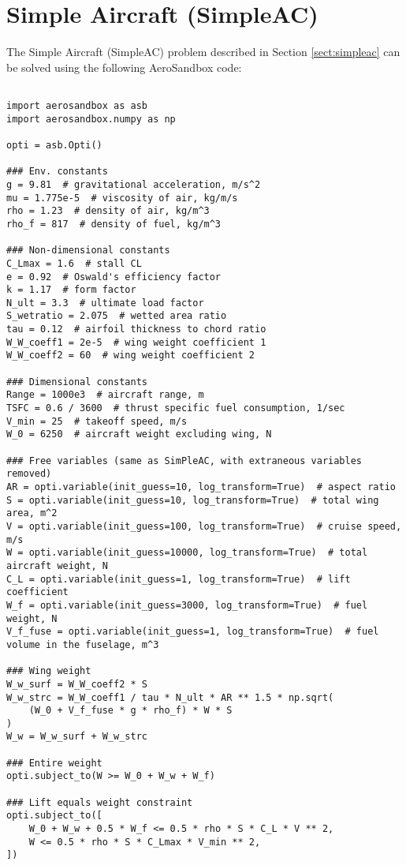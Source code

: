\section{Simple Aircraft (SimpleAC)}
\label{sect:simpleac-code}

The Simple Aircraft (SimpleAC) problem described in Section \ref{sect:simpleac} can be solved using the following AeroSandbox code:

\begin{verbatim}

import aerosandbox as asb
import aerosandbox.numpy as np

opti = asb.Opti()

### Env. constants
g = 9.81  # gravitational acceleration, m/s^2
mu = 1.775e-5  # viscosity of air, kg/m/s
rho = 1.23  # density of air, kg/m^3
rho_f = 817  # density of fuel, kg/m^3

### Non-dimensional constants
C_Lmax = 1.6  # stall CL
e = 0.92  # Oswald's efficiency factor
k = 1.17  # form factor
N_ult = 3.3  # ultimate load factor
S_wetratio = 2.075  # wetted area ratio
tau = 0.12  # airfoil thickness to chord ratio
W_W_coeff1 = 2e-5  # wing weight coefficient 1
W_W_coeff2 = 60  # wing weight coefficient 2

### Dimensional constants
Range = 1000e3  # aircraft range, m
TSFC = 0.6 / 3600  # thrust specific fuel consumption, 1/sec
V_min = 25  # takeoff speed, m/s
W_0 = 6250  # aircraft weight excluding wing, N

### Free variables (same as SimPleAC, with extraneous variables removed)
AR = opti.variable(init_guess=10, log_transform=True)  # aspect ratio
S = opti.variable(init_guess=10, log_transform=True)  # total wing area, m^2
V = opti.variable(init_guess=100, log_transform=True)  # cruise speed, m/s
W = opti.variable(init_guess=10000, log_transform=True)  # total aircraft weight, N
C_L = opti.variable(init_guess=1, log_transform=True)  # lift coefficient
W_f = opti.variable(init_guess=3000, log_transform=True)  # fuel weight, N
V_f_fuse = opti.variable(init_guess=1, log_transform=True)  # fuel volume in the fuselage, m^3

### Wing weight
W_w_surf = W_W_coeff2 * S
W_w_strc = W_W_coeff1 / tau * N_ult * AR ** 1.5 * np.sqrt(
    (W_0 + V_f_fuse * g * rho_f) * W * S
)
W_w = W_w_surf + W_w_strc

### Entire weight
opti.subject_to(W >= W_0 + W_w + W_f)

### Lift equals weight constraint
opti.subject_to([
    W_0 + W_w + 0.5 * W_f <= 0.5 * rho * S * C_L * V ** 2,
    W <= 0.5 * rho * S * C_Lmax * V_min ** 2,
])


\end{verbatim}
